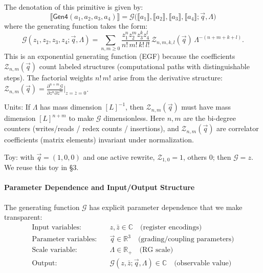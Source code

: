 The denotation of this primitive is given by:
\[
\llbracket \mathsf{Gen4}(a_1, a_2, a_3, a_4)\rrbracket = \mathcal{G}\!\big(\llbracket a_1\rrbracket,\llbracket a_2\rrbracket,\llbracket a_3\rrbracket,\llbracket a_4\rrbracket;\vec{q},\Lambda\big)
\]
where the generating function takes the form:
\begin{equation}
\mathcal{G}(z_1,z_2,z_3,z_4;\vec{q},\Lambda) = \sum_{n,m\ge0}\frac{z_1^n z_2^m z_3^k z_4^l}{n!\,m!\,k!\,l!}\,\mathcal{Z}_{n,m,k,l}(\vec{q})\,\Lambda^{-(n+m+k+l)}.
\label{eq:generating-function-g6}
\end{equation}
This is an exponential generating function (EGF) because the coefficients $\mathcal{Z}_{n,m}(\vec{q})$ count labeled structures (computational paths with distinguishable steps). The factorial weights $n!\,m!$ arise from the derivative structure: $\mathcal{Z}_{n,m}(\vec{q}) = \frac{\partial^{n+m}\mathcal{G}}{\partial z^n \partial \bar{z}^m}\big|_{z=\bar{z}=0}$.

Units: If $\Lambda$ has mass dimension $[L]^{-1}$, then $\mathcal{Z}_{n,m}(\vec{q})$ must have mass dimension $[L]^{n+m}$ to make $\mathcal{G}$ dimensionless. Here $n,m$ are the bi-degree counters (writes/reads / redex counts / insertions), and $\mathcal{Z}_{n,m}(\vec{q})$ are correlator coefficients (matrix elements) invariant under normalization.

Toy: with $\vec{q}=(1,0,0)$ and one active rewrite, $\mathcal{Z}_{1,0}=1$, others $0$; then $\mathcal{G}=z$. We reuse this toy in §3.

\paragraph{Parameter Dependence and Input/Output Structure}
The generating function $\mathcal{G}$ has explicit parameter dependence that we make transparent:
\begin{align}
\text{Input variables:} \quad & z, \bar{z} \in \mathbb{C} \quad \text{(register encodings)} \\
\text{Parameter variables:} \quad & \vec{q} \in \mathbb{R}^3 \quad \text{(grading/coupling parameters)} \\
\text{Scale variable:} \quad & \Lambda \in \mathbb{R}_+ \quad \text{(RG scale)} \\
\text{Output:} \quad & \mathcal{G}(z,\bar{z};\vec{q},\Lambda) \in \mathbb{C} \quad \text{(observable value)}
\end{align}

